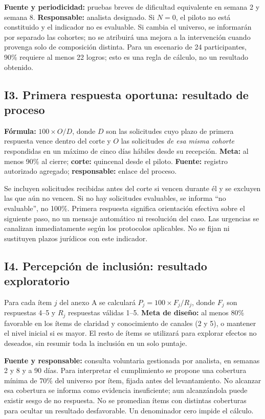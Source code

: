 \documentclass[12pt,letterpaper,oneside]{article}
\begin{document}
\textbf{Fuente y periodicidad:} pruebas breves de dificultad equivalente en semana 2 y semana 8. \textbf{Responsable:} analista designado. Si $N=0$, el piloto no está constituido y el indicador no es evaluable. Si cambia el universo, se informarán por separado las cohortes; no se atribuirá una mejora a la intervención cuando provenga solo de composición distinta. Para un escenario de 24 participantes, 90\% requiere al menos 22 logros; esto es una regla de cálculo, no un resultado obtenido.

\subsection{I3. Primera respuesta oportuna: resultado de proceso}
\textbf{Fórmula:} $100\times O/D$, donde $D$ son las solicitudes cuyo plazo de primera respuesta vence dentro del corte y $O$ las solicitudes \emph{de esa misma cohorte} respondidas en un máximo de cinco días hábiles desde su recepción. \textbf{Meta:} al menos 90\% al cierre; \textbf{corte:} quincenal desde el piloto. \textbf{Fuente:} registro autorizado agregado; \textbf{responsable:} enlace del proceso.

Se incluyen solicitudes recibidas antes del corte si vencen durante él y se excluyen las que aún no vencen. Si no hay solicitudes evaluables, se informa \enquote{no evaluable}, no 100\%. Primera respuesta significa orientación efectiva sobre el siguiente paso, no un mensaje automático ni resolución del caso. Las urgencias se canalizan inmediatamente según los protocolos aplicables. No se fijan ni sustituyen plazos jurídicos con este indicador.

\subsection{I4. Percepción de inclusión: resultado exploratorio}
Para cada ítem $j$ del anexo A se calculará $P_j=100\times F_j/R_j$, donde $F_j$ son respuestas 4--5 y $R_j$ respuestas válidas 1--5. \textbf{Meta de diseño:} al menos 80\% favorable en los ítems de claridad y conocimiento de canales (2 y 5), o mantener el nivel inicial si es mayor. El resto de ítems se utilizará para explorar efectos no deseados, sin resumir toda la inclusión en un solo puntaje.

\textbf{Fuente y responsable:} consulta voluntaria gestionada por analista, en semanas 2 y 8 y a 90 días. Para interpretar el cumplimiento se propone una cobertura mínima de 70\% del universo por ítem, fijada antes del levantamiento. No alcanzar esa cobertura se informa como evidencia insuficiente; aun alcanzándola puede existir sesgo de no respuesta. No se promedian ítems con distintas coberturas para ocultar un resultado desfavorable. Un denominador cero impide el cálculo.
\end{document}
